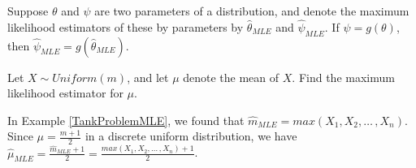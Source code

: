 \begin{prop}\label{MLETransferability} Suppose $\theta$ and $\psi$ are two parameters of a distribution, and denote the maximum likelihood estimators of these by parameters by $\widehat{\theta}_{MLE}$ and $\widehat{\psi}_{MLE}$. If $\psi = g (\theta)$, then $\widehat{\psi}_{MLE} = g(\widehat{\theta}_{MLE})$.
\end{prop}

\begin{examp}Let $X \sim Uniform(m)$, and let $\mu$ denote the mean of $X$. Find the maximum likelihood estimator for $\mu$.
\par
\noindent In Example \ref{TankProblemMLE}, we found that $\widehat{m}_{MLE} = max(X_1,X_2, \dots \,,X_n)$. Since $\mu = \frac{m+1}{2}$ in a discrete uniform distribution, we have $\widehat{\mu}_{MLE} = \frac{\widehat{m}_{MLE}+1}{2} = \frac{max(X_1,X_2, \dots \,,X_n)+1}{2}$.
\end{examp}

